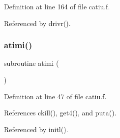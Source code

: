 Definition at line 164 of file catiu.\+f.



Referenced by drivr().

\mbox{\label{catiu_8f_a4742b718b4bb42b9e9d433433bb5b247}} 
\subsubsection{\texorpdfstring{atimi()}{atimi()}}
{\footnotesize\ttfamily subroutine atimi (\begin{DoxyParamCaption}{ }\end{DoxyParamCaption})}



Definition at line 47 of file catiu.\+f.



References ckill(), get4(), and puta().



Referenced by initl().

